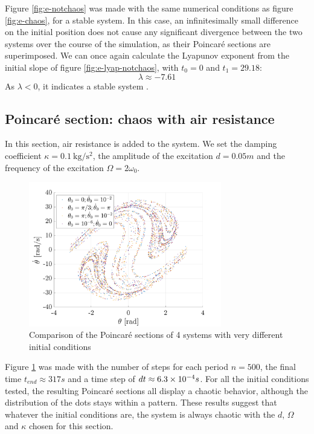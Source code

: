 \documentclass[a4paper,12pt,twoside]{article}
\begin{document}
Figure \ref{fig:e-notchaos} was made with the same numerical conditions as figure \ref{fig:e-chaos}, for a stable system. In this case, an infinitesimally small difference on the initial position does not cause any significant divergence between the two systems over the course of the simulation, as their Poincaré sections are superimposed. We can once again calculate the Lyapunov exponent from the initial slope of figure \ref{fig:e-lyap-notchaos}, with $t_0 = 0$ and $t_1=29.18$:
\begin{equation*}
\lambda \approx -7.61
\end{equation*}
As $\lambda < 0$, it indicates a stable system \cite{Lyap2}.



\subsection{Poincaré section: chaos with air resistance}

In this section, air resistance is added to the system. We set the damping coefficient $\kappa = 0.1 ~ \si{\kg \per \s^2}$, the amplitude of the excitation $d=0.05m$ and the frequency of the excitation $\Omega=2\omega_0$.

\begin{figure}[h]
\centering
	\includegraphics[width=0.75\textwidth]{graphs/f_poincare.png}
	\caption{Comparison of the Poincaré sections of 4 systems with very different initial conditions}
	\label{fig:f-poincare}
\end{figure}

Figure \ref{fig:f-poincare} was made with the number of steps for each period $n=500$, the final time $t_{end} \approx 317 s$ and a time step of $dt \approx \num{6.3d-4} s$. For all the initial conditions tested, the resulting Poincaré sections all display a chaotic behavior, although the distribution of the dots stays within a pattern. These results suggest that whatever the initial conditions are, the system is always chaotic with the $d$, $\Omega$ and $\kappa$ chosen for this section.
\end{document}
